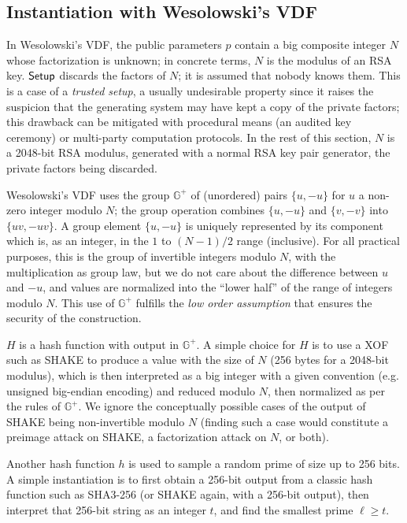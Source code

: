 \documentclass{llncs}
\newcommand{\bG}{\mathbb{G}}
\newcommand{\Setup}{\text{\textsf{Setup}}}
\begin{document}
\subsection{Instantiation with Wesolowski's VDF}

In Wesolowski's VDF\cite{Wes2019}, the public parameters $p$ contain a
big composite integer $N$ whose factorization is unknown; in concrete
terms, $N$ is the modulus of an RSA key. $\Setup$ discards the factors
of $N$; it is assumed that nobody knows them. This is a case of a
\emph{trusted setup}, a usually undesirable property since it raises the
suspicion that the generating system may have kept a copy of the private
factors; this drawback can be mitigated with procedural means (an
audited key ceremony) or multi-party computation
protocols\cite{CheCohDoeKonLeeRosShe2020}. In the rest of this section,
$N$ is a 2048-bit RSA modulus, generated with a normal RSA key pair
generator, the private factors being discarded.

Wesolowski's VDF uses the group $\bG^+$ of (unordered) pairs $\{u, -u\}$
for $u$ a non-zero integer modulo $N$; the group operation combines
$\{u, -u\}$ and $\{v, -v\}$ into $\{uv, -uv\}$. A group element $\{u,
-u\}$ is uniquely represented by its component which is, as an integer,
in the $1$ to $(N-1)/2$ range (inclusive). For all practical purposes,
this is the group of invertible integers modulo $N$, with the
multiplication as group law, but we do not care about the difference
between $u$ and $-u$, and values are normalized into the ``lower half''
of the range of integers modulo $N$. This use of $\bG^+$ fulfills the
\emph{low order assumption} that ensures the security of the
construction\cite{BonBunFis2018}.

$H$ is a hash function with output in $\bG^+$. A simple choice for $H$
is to use a XOF such as SHAKE\cite{Fips202} to produce a value with the
size of $N$ (256 bytes for a 2048-bit modulus), which is then
interpreted as a big integer with a given convention (e.g. unsigned
big-endian encoding) and reduced modulo $N$, then normalized as per the
rules of $\bG^+$. We ignore the conceptually possible cases of the
output of SHAKE being non-invertible modulo $N$ (finding such a case
would constitute a preimage attack on SHAKE, a factorization attack on
$N$, or both).

Another hash function $h$ is used to sample a random prime of size up to
256 bits. A simple instantiation is to first obtain a 256-bit output
from a classic hash function such as SHA3-256 (or SHAKE again, with a
256-bit output), then interpret that 256-bit string as an integer $t$,
and find the smallest prime $\ell\geq t$.
\end{document}
